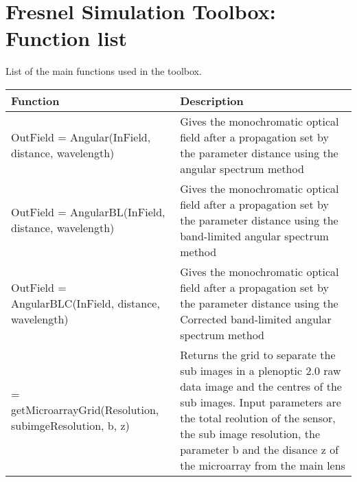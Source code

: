 \chapter*{Fresnel Simulation Toolbox: Function list}
List of the main functions used in the toolbox. 
\begin{center}
    \begin{tabular}{| p{8cm} | p{6cm} |}
    \hline
    Function & Description \\ \hline 
    OutField = Angular(InField, distance, wavelength) & Gives the monochromatic optical field after a propagation set by the parameter distance using the angular spectrum method \\ \hline
    OutField = AngularBL(InField, distance, wavelength) & Gives the monochromatic optical field after a propagation set by the parameter distance using the band-limited angular spectrum method \\ \hline
    OutField = AngularBLC(InField, distance, wavelength) & Gives the monochromatic optical field after a propagation set by the parameter distance using the Corrected band-limited angular spectrum method \\ \hline
    [Grid, centres] = getMicroarrayGrid(Resolution, subimgeResolution, b, z) & Returns the grid to separate the sub images in a plenoptic 2.0 raw data image and the centres of the sub images. Input parameters are the total reolution of the sensor, the sub image resolution, the parameter b and the disance z of the microarray from the main lens \\ \hline
            
        \hline
    \end{tabular}
\end{center}
\newpage

